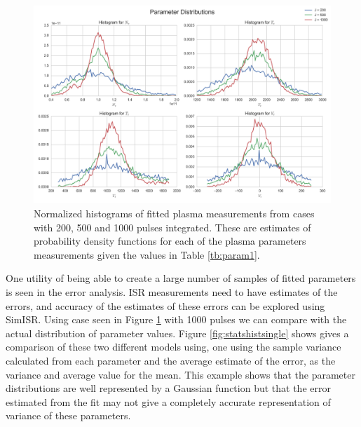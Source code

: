 \documentclass[draft,ras]{agutex}
\begin{document}
\begin{article}
\begin{figure}[!t]
\centering
\includegraphics[width=5in]{datahist}
\caption{Normalized histograms of fitted plasma measurements from cases with 200, 500 and 1000 pulses integrated. These are estimates of probability density functions for each of the plasma parameters measurements given the values in Table \ref{tb:param1}.}
\label{fig:statshistall}
\end{figure}

One utility of being able to create a large number of samples of fitted parameters is seen in the error analysis. ISR measurements need to have estimates of the errors, and accuracy of the estimates of these errors can be explored using SimISR. Using case seen in Figure \ref{fig:statshistall} with 1000 pulses we can compare with the actual distribution of parameter values. Figure \ref{fig:statshistsingle} shows gives a comparison of these two different models using, one using the sample variance calculated from each parameter and the average estimate of the error, as the variance and average value for the mean. This example shows that the parameter distributions are well represented by a Gaussian function but that the error estimated from the fit may not give a completely accurate representation of variance of these parameters. 


\end{article}
\end{document}
